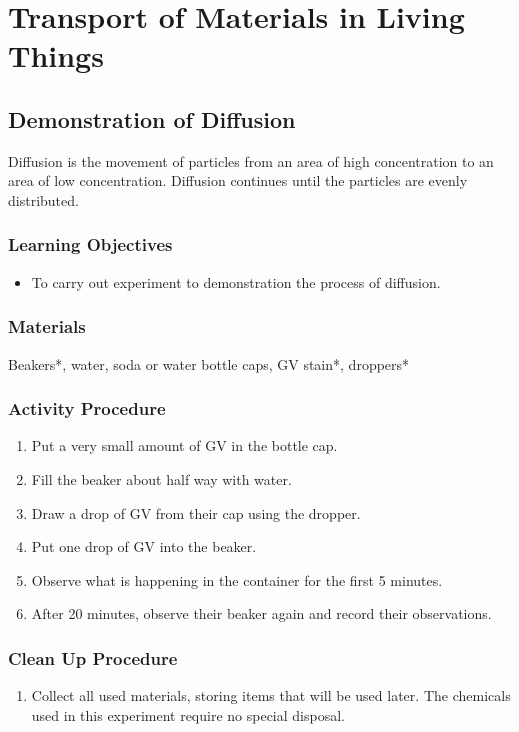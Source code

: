 \section{Transport of Materials in Living Things}

\subsection{Demonstration of Diffusion}

Diffusion is the movement of particles from an area of high concentration to an area of low concentration. Diffusion continues until the particles are evenly distributed.

\subsubsection*{Learning Objectives}
\begin{itemize}
\item{To carry out experiment to demonstration the process of diffusion.}
\end{itemize}

\subsubsection*{Materials}
Beakers*, water, soda or water bottle caps, GV stain*, droppers*

\subsubsection*{Activity Procedure}
\begin{enumerate}
\item{Put a very small amount of GV in the bottle cap.}
\item{Fill the beaker about half way with water.}
\item{Draw a drop of GV from their cap using the dropper.}
\item{Put one drop of GV into the beaker.}
\item{Observe what is happening in the container for the first 5 minutes.}
\item{After 20 minutes, observe their beaker again and record their observations.}
\end{enumerate}

\subsubsection*{Clean Up Procedure}
\begin{enumerate}
\item{Collect all used materials, storing items that will be used later. The chemicals used in this experiment require no special disposal.}
\end{enumerate}

